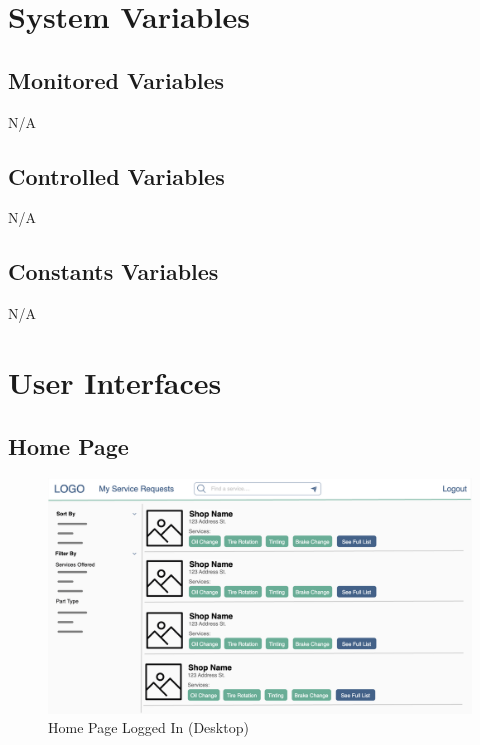 \documentclass[12pt, titlepage]{article}
\begin{document}
\section{System Variables}
\subsection{Monitored Variables}
N/A

\subsection{Controlled Variables}
N/A

\subsection{Constants Variables}
N/A

\section{User Interfaces}


\subsection{Home Page}

\begin{figure}[H]
	\centering
	\includegraphics[width=\textwidth]{mockups/Home Page (Logged In) (Desktop).png}
	\caption{Home Page \textemdash{} Logged In (Desktop)}
\end{figure}
\end{document}
